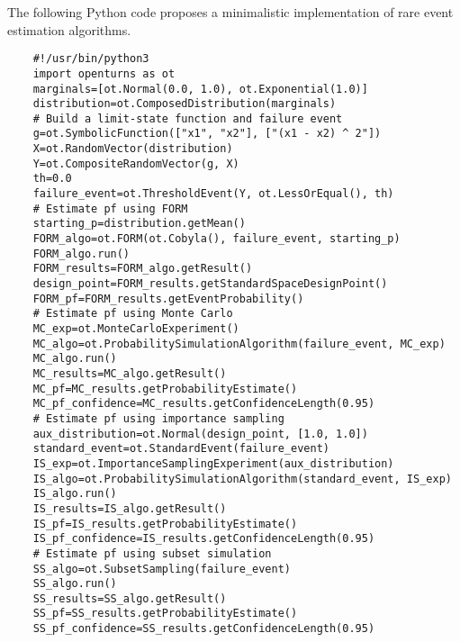 \begin{otexample}
    The following Python code proposes a minimalistic \ot implementation of rare event estimation algorithms. 
    \lstset{style=mystyle, language=python}
%
\begin{lstlisting}
    #!/usr/bin/python3
    import openturns as ot
    marginals=[ot.Normal(0.0, 1.0), ot.Exponential(1.0)]
    distribution=ot.ComposedDistribution(marginals)
    # Build a limit-state function and failure event
    g=ot.SymbolicFunction(["x1", "x2"], ["(x1 - x2) ^ 2"])
    X=ot.RandomVector(distribution)
    Y=ot.CompositeRandomVector(g, X)
    th=0.0
    failure_event=ot.ThresholdEvent(Y, ot.LessOrEqual(), th)
    # Estimate pf using FORM
    starting_p=distribution.getMean()
    FORM_algo=ot.FORM(ot.Cobyla(), failure_event, starting_p)
    FORM_algo.run()
    FORM_results=FORM_algo.getResult()
    design_point=FORM_results.getStandardSpaceDesignPoint()
    FORM_pf=FORM_results.getEventProbability()
    # Estimate pf using Monte Carlo 
    MC_exp=ot.MonteCarloExperiment()
    MC_algo=ot.ProbabilitySimulationAlgorithm(failure_event, MC_exp)
    MC_algo.run()
    MC_results=MC_algo.getResult()
    MC_pf=MC_results.getProbabilityEstimate()
    MC_pf_confidence=MC_results.getConfidenceLength(0.95)
    # Estimate pf using importance sampling
    aux_distribution=ot.Normal(design_point, [1.0, 1.0])
    standard_event=ot.StandardEvent(failure_event)
    IS_exp=ot.ImportanceSamplingExperiment(aux_distribution)
    IS_algo=ot.ProbabilitySimulationAlgorithm(standard_event, IS_exp)
    IS_algo.run()
    IS_results=IS_algo.getResult()
    IS_pf=IS_results.getProbabilityEstimate()
    IS_pf_confidence=IS_results.getConfidenceLength(0.95)
    # Estimate pf using subset simulation
    SS_algo=ot.SubsetSampling(failure_event)
    SS_algo.run()
    SS_results=SS_algo.getResult()
    SS_pf=SS_results.getProbabilityEstimate()
    SS_pf_confidence=SS_results.getConfidenceLength(0.95)
\end{lstlisting}
%
\end{otexample}


